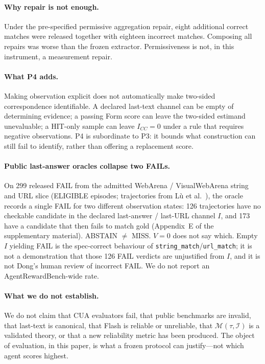 \documentclass[sigconf,anonymous]{aamas}
\begin{document}
\paragraph{Why repair is not enough.}
Under the pre-specified permissive aggregation repair, eight additional correct matches were released together with eighteen incorrect matches.
Composing all repairs was worse than the frozen extractor.
Permissiveness is not, in this instrument, a measurement repair.

\paragraph{What P4 adds.}
Making observation explicit does not automatically make two-sided correspondence identifiable.
A declared last-text channel can be empty of determining evidence; a passing Form score can leave the two-sided estimand unevaluable; a HIT-only sample can leave $I_{CC}=0$ under a rule that requires negative observations.
P4 is subordinate to P3: it bounds what construction can still fail to identify, rather than offering a replacement score.

\paragraph{Public last-answer oracles collapse two FAILs.}
On 299 released FAIL from the admitted WebArena / VisualWebArena string and URL slice (ELIGIBLE episodes; trajectories from L\`u et al.~\citep{lu2025agentrewardbench}), the oracle records a single FAIL for two different observation states: 126 trajectories have no checkable candidate in the declared last-answer / last-URL channel $I$, and 173 have a candidate that then fails to match gold (Appendix~E of the supplementary material).
ABSTAIN $\neq$ MISS.
$V{=}0$ does not say which.
Empty $I$ yielding FAIL is the spec-correct behaviour of \texttt{string\_match}/\texttt{url\_match}; it is not a demonstration that those 126 FAIL verdicts are unjustified from $I$, and it is not Dong's human review of incorrect FAIL.
We do not report an AgentRewardBench-wide rate.

\paragraph{What we do not establish.}
We do not claim that CUA evaluators fail, that public benchmarks are invalid, that last-text is canonical, that Flash is reliable or unreliable, that $\mathcal{M}(\tau,\mathcal{I})$ is a validated theory, or that a new reliability metric has been produced.
The object of evaluation, in this paper, is what a frozen protocol can justify---not which agent scores highest.
\end{document}
